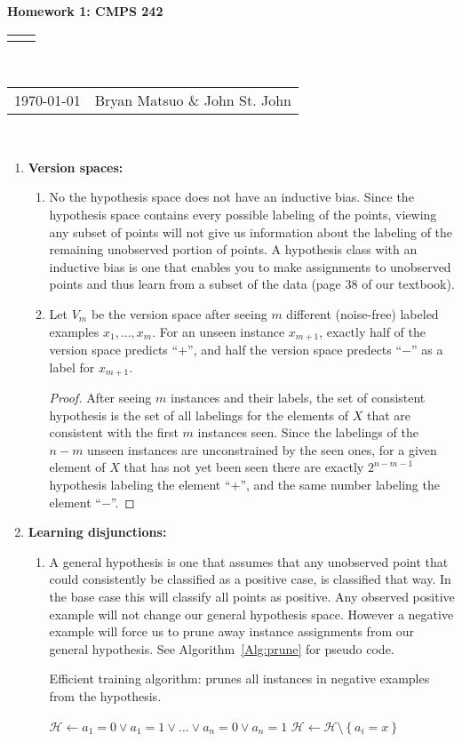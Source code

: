 \documentclass[12pt]{article}
\renewcommand{\title}[1]{\textbf{#1}\\}
\renewcommand{\line}{\begin{tabularx}{\textwidth}{X>{\raggedleft}X}\hline\\\end{tabularx}\\[-0.5cm]}
\newcommand{\leftright}[2]{\begin{tabularx}{\textwidth}{X>{\raggedleft}X}#1%
& #2\\\end{tabularx}\\[-0.5cm]}
\begin{document}
\title{Homework 1: CMPS 242}
\line
\leftright{\today}{Bryan Matsuo \& John St. John} %
\begin{enumerate}
\item \textbf{Version spaces: }

\begin{enumerate}
\item No the hypothesis space does not have an inductive bias. Since the
hypothesis space contains every possible labeling of the points, viewing
any subset of points will not give us information about the labeling
of the remaining unobserved portion of points. A hypothesis class
with an inductive bias is one that enables you to make assignments
to unobserved points and thus learn from a subset of the data (page
38 of our textbook).
\item 
Let $V_m$ be the version space after seeing $m$ different (noise-free) labeled examples $x_1, \dots, x_m$. For an unseen instance $x_{m+1}$, exactly half of the version space predicts ``$+$'', and half the version space predects ``$-$'' as a label for $x_{m+1}$.

\begin{proof}
    After seeing $m$ instances and their labels, the set of consistent hypothesis is the set of all labelings for the elements of $X$ that are consistent with the first $m$ instances seen. Since the labelings of the $n-m$ unseen instances are unconstrained by the seen ones, for a given element of $X$ that has not yet been seen there are exactly $2^{n-m-1}$ hypothesis labeling the element ``$+$'', and the same number labeling the element ``$-$''.
\end{proof}

\end{enumerate}
\item \textbf{ Learning disjunctions: }

\begin{enumerate}
\item A general hypothesis is one that assumes that any unobserved point
that could consistently be classified as a positive case, is classified
that way. In the base case this will classify all points as positive.
Any observed positive example will not change our general hypothesis
space. However a negative example will force us to prune away instance
assignments from our general hypothesis. See Algorithm~\ref{Alg:prune} for pseudo code.
\begin{algorithm}
\caption{Efficient training algorithm: prunes all instances in negative examples from the hypothesis. }
\label{Alg:prune}
\begin{algorithmic}
\STATE $\mathcal{H} \gets a_1=0 \vee a_1=1 \vee \ldots \vee a_n=0 \vee a_n=1$
			\STATE $\mathcal{H} \gets \mathcal{H} \setminus \left\{a_i=x\right\}$
		\ENDFOR
	\ENDIF
\ENDFOR
\end{algorithmic}
\end{algorithm}


\end{enumerate}
\end{enumerate}
\end{document}
